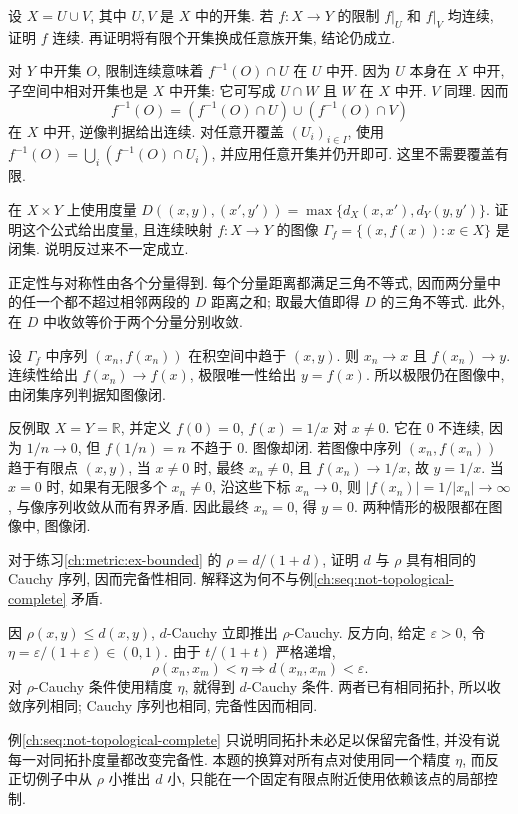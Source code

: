 \begin{exercise}\label{ch:seq:ex-open-union}
设 $X=U\cup V$, 其中 $U,V$ 是 $X$ 中的开集. 若 $f:X\to Y$ 的限制 $f|_U$ 和 $f|_V$ 均连续, 证明 $f$ 连续. 再证明将有限个开集换成任意族开集, 结论仍成立.
\end{exercise}
\begin{solution}
对 $Y$ 中开集 $O$, 限制连续意味着 $f^{-1}(O)\cap U$ 在 $U$ 中开. 因为 $U$ 本身在 $X$ 中开, 子空间中相对开集也是 $X$ 中开集: 它可写成 $U\cap W$ 且 $W$ 在 $X$ 中开. $V$ 同理. 因而
\[
 f^{-1}(O)=(f^{-1}(O)\cap U)\cup(f^{-1}(O)\cap V)
\]
在 $X$ 中开, 逆像判据给出连续. 对任意开覆盖 $(U_i)_{i\in I}$, 使用 $f^{-1}(O)=\bigcup_i(f^{-1}(O)\cap U_i)$, 并应用任意开集并仍开即可. 这里不需要覆盖有限.
\end{solution}

\begin{exercise}\label{ch:seq:ex-graph}
在 $X\times Y$ 上使用度量
$D((x,y),(x',y'))=\max\{d_X(x,x'),d_Y(y,y')\}$.
证明这个公式给出度量, 且连续映射 $f:X\to Y$ 的图像
$\Gamma_f=\{(x,f(x)):x\in X\}$ 是闭集. 说明反过来不一定成立.
\end{exercise}
\begin{solution}
正定性与对称性由各个分量得到. 每个分量距离都满足三角不等式, 因而两分量中的任一个都不超过相邻两段的 $D$ 距离之和; 取最大值即得 $D$ 的三角不等式. 此外, 在 $D$ 中收敛等价于两个分量分别收敛.

设 $\Gamma_f$ 中序列 $(x_n,f(x_n))$ 在积空间中趋于 $(x,y)$. 则 $x_n\to x$ 且 $f(x_n)\to y$. 连续性给出 $f(x_n)\to f(x)$, 极限唯一性给出 $y=f(x)$. 所以极限仍在图像中, 由闭集序列判据知图像闭.

反例取 $X=Y=\mathbb{R}$, 并定义 $f(0)=0$, $f(x)=1/x$ 对 $x\ne0$. 它在 $0$ 不连续, 因为 $1/n\to0$, 但 $f(1/n)=n$ 不趋于 $0$. 图像却闭. 若图像中序列 $(x_n,f(x_n))$ 趋于有限点 $(x,y)$, 当 $x\ne0$ 时, 最终 $x_n\ne0$, 且 $f(x_n)\to1/x$, 故 $y=1/x$. 当 $x=0$ 时, 如果有无限多个 $x_n\ne0$, 沿这些下标 $x_n\to0$, 则 $|f(x_n)|=1/|x_n|\to\infty$, 与像序列收敛从而有界矛盾. 因此最终 $x_n=0$, 得 $y=0$. 两种情形的极限都在图像中, 图像闭.
\end{solution}

\begin{exercise}\label{ch:seq:ex-truncated-cauchy}
对于练习\ref{ch:metric:ex-bounded} 的 $\rho=d/(1+d)$, 证明 $d$ 与 $\rho$ 具有相同的 Cauchy 序列, 因而完备性相同. 解释这为何不与例\ref{ch:seq:not-topological-complete} 矛盾.
\end{exercise}
\begin{solution}
因 $\rho(x,y)\le d(x,y)$, $d$-Cauchy 立即推出 $\rho$-Cauchy. 反方向, 给定 $\varepsilon>0$, 令 $\eta=\varepsilon/(1+\varepsilon)\in(0,1)$. 由于 $t/(1+t)$ 严格递增,
\[
 \rho(x_n,x_m)<\eta\Longrightarrow d(x_n,x_m)<\varepsilon.
\]
对 $\rho$-Cauchy 条件使用精度 $\eta$, 就得到 $d$-Cauchy 条件. 两者已有相同拓扑, 所以收敛序列相同; Cauchy 序列也相同, 完备性因而相同.

例\ref{ch:seq:not-topological-complete} 只说明同拓扑未必足以保留完备性, 并没有说每一对同拓扑度量都改变完备性. 本题的换算对所有点对使用同一个精度 $\eta$, 而反正切例子中从 $\rho$ 小推出 $d$ 小, 只能在一个固定有限点附近使用依赖该点的局部控制.
\end{solution}
